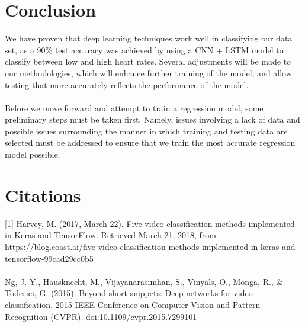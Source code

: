 \documentclass{article}
\begin{document}
\section*{Conclusion}
{We have proven that deep learning techniques work well in classifying our data set, as a 90\% test accuracy was achieved by using a CNN + LSTM model to classify between low and high heart rates. Several adjustments will be made to our methodologies, which will enhance further training of the model, and allow testing that more accurately reflects the performance of the model. \\ \\
\noindent Before we move forward and attempt to train a regression model, some preliminary steps must be taken first. Namely, issues involving a lack of data and possible issues surrounding the manner in which training and testing data are selected must be addressed to ensure that we train the most accurate regression model possible.}
 \newpage
 \section*{Citations}
 {[1] Harvey, M. (2017, March 22). Five video classification methods implemented in Keras and TensorFlow. Retrieved March 21, 2018, from https://blog.coast.ai/five-video-classification-methods-implemented-in-keras-and-tensorflow-99cad29cc0b5 \\ \\

\noindent[2] Ng, J. Y., Hausknecht, M., Vijayanarasimhan, S., Vinyals, O., Monga, R., \& Toderici, G. (2015). Beyond short snippets: Deep networks for video classification. 2015 IEEE Conference on Computer Vision and Pattern Recognition (CVPR). doi:10.1109/cvpr.2015.7299101
}
\end{document}
